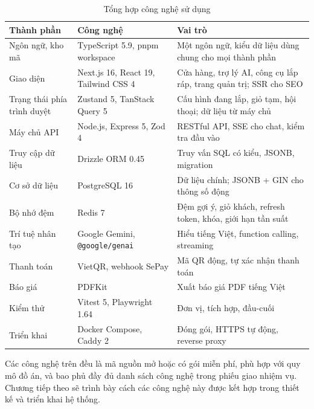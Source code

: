 \begin{table}[H]
\centering\small
\begin{tabular}{|L{3.2cm}|L{4.3cm}|L{6.4cm}|}
\hline
\textbf{Thành phần} & \textbf{Công nghệ} & \textbf{Vai trò} \\ \hline
Ngôn ngữ, kho mã & TypeScript 5.9, pnpm workspace & Một ngôn ngữ, kiểu dữ liệu dùng chung cho mọi thành phần \\ \hline
Giao diện & Next.js 16, React 19, Tailwind CSS 4 & Cửa hàng, trợ lý AI, công cụ lắp ráp, trang quản trị; SSR cho SEO \\ \hline
Trạng thái phía trình duyệt & Zustand 5, TanStack Query 5 & Cấu hình đang lắp, giỏ tạm, hội thoại; dữ liệu từ máy chủ \\ \hline
Máy chủ API & Node.js, Express 5, Zod 4 & RESTful API, SSE cho chat, kiểm tra đầu vào \\ \hline
Truy cập dữ liệu & Drizzle ORM 0.45 & Truy vấn SQL có kiểu, JSONB, migration \\ \hline
Cơ sở dữ liệu & PostgreSQL 16 & Dữ liệu chính; JSONB + GIN cho thông số động \\ \hline
Bộ nhớ đệm & Redis 7 & Đệm gợi ý, giỏ khách, refresh token, khóa, giới hạn tần suất \\ \hline
Trí tuệ nhân tạo & Google Gemini, \texttt{@google/genai} & Hiểu tiếng Việt, function calling, streaming \\ \hline
Thanh toán & VietQR, webhook SePay & Mã QR động, tự xác nhận thanh toán \\ \hline
Báo giá & PDFKit & Xuất báo giá PDF tiếng Việt \\ \hline
Kiểm thử & Vitest 5, Playwright 1.64 & Đơn vị, tích hợp, đầu-cuối \\ \hline
Triển khai & Docker Compose, Caddy 2 & Đóng gói, HTTPS tự động, reverse proxy \\ \hline
\end{tabular}
\caption{Tổng hợp công nghệ sử dụng}
\label{tab:cong-nghe}
\end{table}

Các công nghệ trên đều là mã nguồn mở hoặc có gói miễn phí, phù hợp với quy mô đồ án, và bao phủ đầy đủ danh sách công nghệ trong phiếu giao nhiệm vụ. Chương tiếp theo sẽ trình bày cách các công nghệ này được kết hợp trong thiết kế và triển khai hệ thống.
